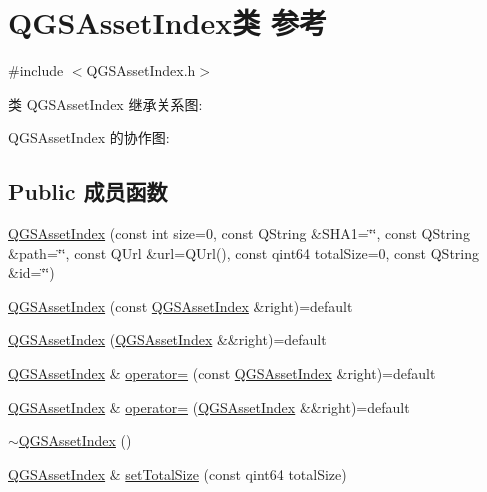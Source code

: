 \hypertarget{class_q_g_s_asset_index}{}\section{Q\+G\+S\+Asset\+Index类 参考}
\label{class_q_g_s_asset_index}


{\ttfamily \#include $<$Q\+G\+S\+Asset\+Index.\+h$>$}



类 Q\+G\+S\+Asset\+Index 继承关系图\+:


Q\+G\+S\+Asset\+Index 的协作图\+:
\subsection*{Public 成员函数}
\begin{DoxyCompactItemize}
\item 
\mbox{\hyperlink{class_q_g_s_asset_index_a83e2e39f05b5b90276f3696420fe531d}{Q\+G\+S\+Asset\+Index}} (const int size=0, const Q\+String \&S\+H\+A1=\char`\"{}\char`\"{}, const Q\+String \&path=\char`\"{}\char`\"{}, const Q\+Url \&url=Q\+Url(), const qint64 total\+Size=0, const Q\+String \&id=\char`\"{}\char`\"{})
\item 
\mbox{\hyperlink{class_q_g_s_asset_index_a236750163ce140f90473dff04ec40c60}{Q\+G\+S\+Asset\+Index}} (const \mbox{\hyperlink{class_q_g_s_asset_index}{Q\+G\+S\+Asset\+Index}} \&right)=default
\item 
\mbox{\hyperlink{class_q_g_s_asset_index_aedd9b39399c4e9e68a5145d0f9fecf65}{Q\+G\+S\+Asset\+Index}} (\mbox{\hyperlink{class_q_g_s_asset_index}{Q\+G\+S\+Asset\+Index}} \&\&right)=default
\item 
\mbox{\hyperlink{class_q_g_s_asset_index}{Q\+G\+S\+Asset\+Index}} \& \mbox{\hyperlink{class_q_g_s_asset_index_afaac23ae02df043525e0d80594b368e9}{operator=}} (const \mbox{\hyperlink{class_q_g_s_asset_index}{Q\+G\+S\+Asset\+Index}} \&right)=default
\item 
\mbox{\hyperlink{class_q_g_s_asset_index}{Q\+G\+S\+Asset\+Index}} \& \mbox{\hyperlink{class_q_g_s_asset_index_a071ee195277d48ae3745c9dd6cfa1243}{operator=}} (\mbox{\hyperlink{class_q_g_s_asset_index}{Q\+G\+S\+Asset\+Index}} \&\&right)=default
\item 
\mbox{\hyperlink{class_q_g_s_asset_index_a2a0655e961f059ea93c8c08f7f0a33aa}{$\sim$\+Q\+G\+S\+Asset\+Index}} ()
\item 
\mbox{\hyperlink{class_q_g_s_asset_index}{Q\+G\+S\+Asset\+Index}} \& \mbox{\hyperlink{class_q_g_s_asset_index_ad5f60616a920c9988ef6c18598dc8b6c}{set\+Total\+Size}} (const qint64 total\+Size)

\end{DoxyCompactItemize}
